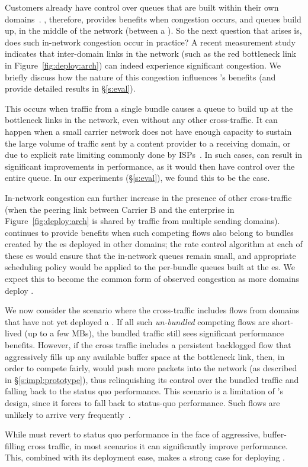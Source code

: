 Customers already have control over queues that are built within their own domains~\cite{swan, b4, bwe}. \name, therefore, provides benefits when congestion occurs, and queues build up, in the middle of the network (\ie between a \pair).  
So the next question that arises is, does such in-network congestion occur in practice? A recent measurement study~\cite{inferring-interdomain-congestion} indicates that inter-domain links in the network (such as the red bottleneck link in Figure~\ref{fig:deploy:arch}) can indeed experience significant congestion. 
We briefly discuss how the nature of this congestion influences \name's benefits (and provide detailed results in \S\ref{s:eval}).

 This occurs when traffic from a single bundle causes a queue to build up at the bottleneck links in the network, even without any other cross-traffic. It can happen when a small carrier network does not have enough capacity to sustain the large volume of traffic sent by a content provider to a receiving domain, or due to explicit rate limiting commonly done by ISPs~\cite{isp-throttle-1, isp-throttle-2, isp-throttle-3}. In such cases, \name can result in
significant improvements in performance, as it would then have control over the entire queue. In our experiments (\S\ref{s:eval}), we found this to be the case.

 In-network congestion can further increase in the presence of other cross-traffic (\eg when the peering link between Carrier B and the enterprise in Figure~\ref{fig:deploy:arch} is shared by traffic from multiple sending domains). \name continues to provide benefits when such competing flows also belong to bundles created by the {\inbox}es deployed in other domains; the rate control algorithm at each of these {\inbox}es would ensure that the in-network queues remain small, and appropriate scheduling policy would be applied to the per-bundle queues built at the {\inbox}es.
We expect this to become the common form of observed congestion as more domains deploy \name. 

 We now consider the scenario where the cross-traffic includes flows from domains that have not yet deployed a \name. If all such \emph{un-bundled} competing flows are short-lived (up to a few MBs), the bundled traffic still sees significant performance benefits. 
However, if the cross traffic includes a persistent backlogged flow that aggressively fills up any available buffer space at the bottleneck link, then, in order to compete fairly, \name would push more packets into the network (as described in \S\ref{s:impl:prototype}), thus relinquishing its control over the bundled traffic and falling back to the status quo performance. 
This scenario is a limitation of \name's design, since it forces \name to fall back to status-quo performance.
 Such flows are unlikely to arrive very frequently~\cite{caida-dataset}. 

\vspace{0.05in}
 While \name must revert to status quo performance in the face of aggressive, buffer-filling cross traffic, in most scenarios it can significantly improve performance.
This, combined with its deployment ease, makes a strong case for deploying \name. 

